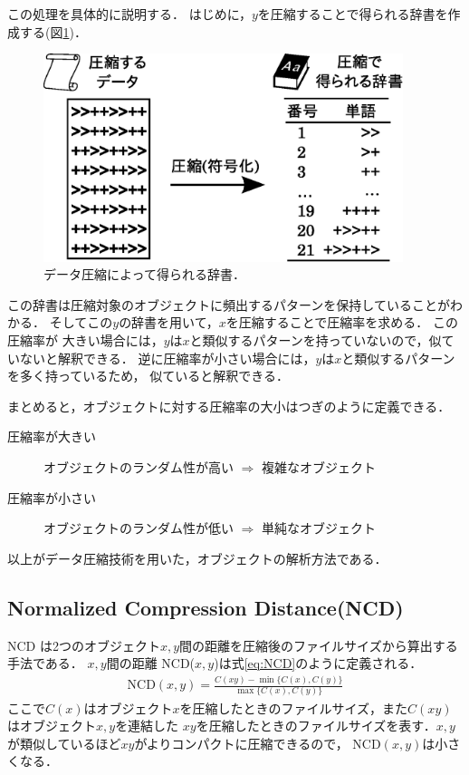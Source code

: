 この処理を具体的に説明する．
はじめに，$y$を圧縮することで得られる辞書を作成する(図\ref{dic})．
\begin{figure}[tb]
\begin{center}
\includegraphics[width=10.5cm]{image/dic.eps}
\end{center}
\caption{データ圧縮によって得られる辞書．}
\label{dic}
\end{figure}
この辞書は圧縮対象のオブジェクトに頻出するパターンを保持していることがわかる．
そしてこの$y$の辞書を用いて，$x$を圧縮することで圧縮率を求める．
この圧縮率が
大きい場合には，$y$は$x$と類似するパターンを持っていないので，似ていないと解釈できる．
逆に圧縮率が小さい場合には，$y$は$x$と類似するパターンを多く持っているため，
似ていると解釈できる．

まとめると，オブジェクトに対する圧縮率の大小はつぎのように定義できる．
\begin{description}
	\item [圧縮率が大きい] オブジェクトのランダム性が高い $\Rightarrow$ 複雑なオブジェクト
	\item [圧縮率が小さい] オブジェクトのランダム性が低い $\Rightarrow$ 単純なオブジェクト
\end{description}
以上がデータ圧縮技術を用いた，オブジェクトの解析方法である．


\subsection{Normalized Compression Distance(NCD)}
\label{subsec:NCD}

NCD \cite{NCD} は2つのオブジェクト$x,y$間の距離を圧縮後のファイルサイズから算出する手法である．
$x,y$間の距離 NCD($x,y$)は式\ref{eq:NCD}のように定義される．
\begin{eqnarray}
\mathrm{NCD}(x,y) = \frac{C(xy) - \min\{C(x),C(y)\}}{\max\{C(x),C(y)\}} \label{eq:NCD}
\end{eqnarray}
ここで$C(x)$はオブジェクト$x$を圧縮したときのファイルサイズ，また$C(xy)$はオブジェクト$x,y$を連結した
$xy$を圧縮したときのファイルサイズを表す．$x,y$が類似しているほど$xy$がよりコンパクトに圧縮できるので，
$\mbox{NCD}(x,y)$は小さくなる．

